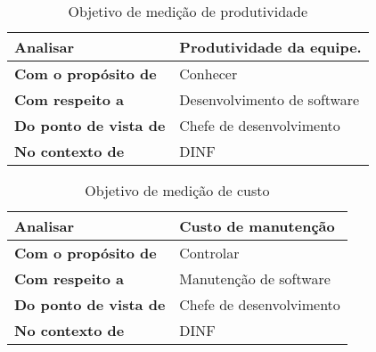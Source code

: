 
\begin{table}[H]
\centering
\begin{tabular}{|p{3cm}|p{6cm}|}
\hline
	\textbf{Analisar} &
  Produtividade da equipe.
	\\ \hline
	\textbf{Com o propósito de} &
  Conhecer
	\\ \hline
	\textbf{Com respeito a} &
  Desenvolvimento de software
	\\ \hline
	\textbf{Do ponto de vista de} &
	Chefe de desenvolvimento
	\\ \hline
	\textbf{No contexto de} &
	DINF
	\\ \hline
\end{tabular}
\caption{Objetivo de medição de produtividade}
\label{tab:objetivo_produtividade}
\end{table}

\begin{table}[H]
\centering
\begin{tabular}{|p{3cm}|p{6cm}|}
\hline
	\textbf{Analisar} &
  Custo de manutenção
	\\ \hline
	\textbf{Com o propósito de} &
  Controlar
	\\ \hline
	\textbf{Com respeito a} &
  Manutenção de software
	\\ \hline
	\textbf{Do ponto de vista de} &
	Chefe de desenvolvimento
	\\ \hline
	\textbf{No contexto de} &
	DINF
	\\ \hline
\end{tabular}
\caption{Objetivo de medição de custo}
\label{tab:objetivo_custo}
\end{table}

